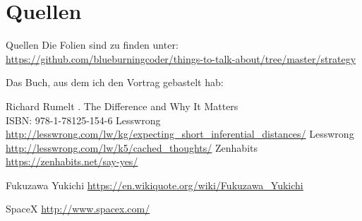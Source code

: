 \section{Quellen}
\begin{frame}{Quellen}
    Die Folien sind zu finden unter: \\
    \url{https://github.com/blueburningcoder/things-to-talk-about/tree/master/strategy}


    Das Buch, aus dem ich den Vortrag gebastelt hab:

    \begin{thebibliography}{10}
    \beamertemplatebookbibitems
        Richard Rumelt
        .
        \newblock The Difference and Why It Matters \\
                  ISBN: 978-1-78125-154-6
    \beamertemplatearticlebibitems
        Lesswrong
            \newblock \url{http://lesswrong.com/lw/kg/expecting\_short\_inferential\_distances/}
        Lesswrong
            \newblock \url{http://lesswrong.com/lw/k5/cached\_thoughts/}
        Zenhabits
            \newblock \url{https://zenhabits.net/say-yes/}

        Fukuzawa Yukichi
            \newblock \url{https://en.wikiquote.org/wiki/Fukuzawa\_Yukichi}

        SpaceX
            \newblock \url{http://www.spacex.com/}

    \end{thebibliography}

\end{frame}
